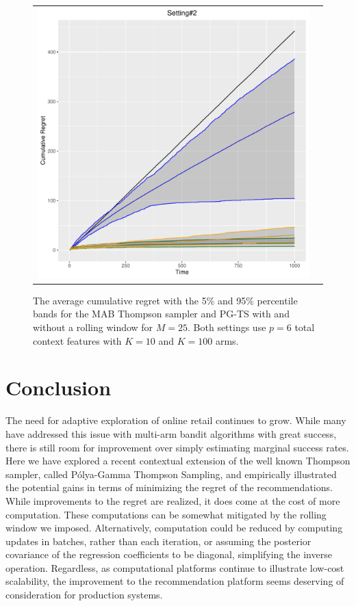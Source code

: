 \documentclass[12pt]{article}
\begin{document}
\begin{figure}[t]
\begin{tabular}{c c}
\includegraphics[scale = .4]{../../figures/experiment3-plot.pdf}
\end{tabular}
\caption{The average cumulative regret with the 5\% and 95\% percentile bands for
the MAB Thompson sampler and PG-TS with and without a rolling window for $M = 25$.
Both settings use $p = 6$ total context features with $K = 10$ and $K = 100$ arms.}
\label{figure:main-results}
\end{figure}

\section{Conclusion} \label{sec:conclusion}

The need for adaptive exploration of online retail continues to grow.  
While many have addressed this issue with multi-arm bandit algorithms with great
success, there is still room for improvement over simply estimating marginal
success rates.
Here we have explored a recent contextual extension of the well known Thompson
sampler, called P\'olya-Gamma Thompson Sampling, and empirically illustrated the 
potential gains in terms of minimizing the regret of the recommendations.
While improvements to the regret are realized, it does come at the cost of more
computation.
These computations can be somewhat mitigated by the rolling window we imposed.
Alternatively, computation could be reduced by computing updates in batches, 
rather than each iteration, or assuming the posterior covariance of the regression
coefficients to be diagonal, simplifying the inverse operation.
Regardless, as computational platforms continue to illustrate low-cost scalability,
the improvement to the recommendation platform seems deserving of consideration
for production systems.



\end{document}
